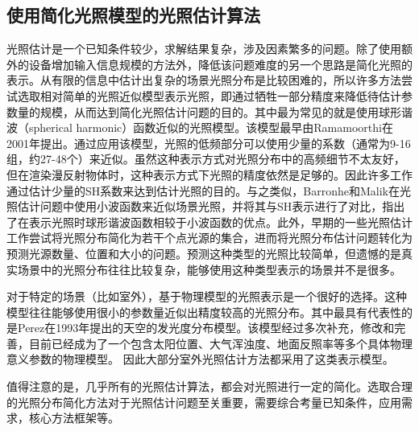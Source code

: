 \subsection{使用简化光照模型的光照估计算法}
光照估计是一个已知条件较少，求解结果复杂，涉及因素繁多的问题。除了使用额外的设备增加输入信息规模的方法外，降低该问题难度的另一个思路是简化光照的表示。从有限的信息中估计出复杂的场景光照分布是比较困难的，所以许多方法尝试选取相对简单的光照近似模型表示光照，即通过牺牲一部分精度来降低待估计参数量的规模，从而达到简化光照估计问题的目的。其中最为常见的就是使用球形谐波（spherical harmonic）函数近似的光照模型。该模型最早由Ramamoorthi\cite{ramamoorthi2001efficient}在2001年提出。通过应用该模型，光照的低频部分可以使用少量的系数（通常为9-16组，约27-48个）来近似。虽然这种表示方式对光照分布中的高频细节不太友好，但在渲染漫反射物体时，这种表示方式下光照的精度依然是足够的。因此许多工作\cite{ramamoorthi2001signal,kemelmacher20113d,garrido2013reconstructing,knorr2014real,li2014intrinsic,barron2015shape}通过估计少量的SH系数来达到估计光照的目的。与之类似，Barronhe和Malik\cite{okabe2004spherical}在光照估计问题中使用小波函数来近似场景光照，并将其与SH表示进行了对比，指出了在表示光照时球形谐波函数相较于小波函数的优点。此外，早期的一些光照估计工作\cite{sato1999acquiring,  panagopoulos2011illumination, wang2002estimation, li2003multiple, sato2003illumination}尝试将光照分布简化为若干个点光源的集合，进而将光照分布估计问题转化为预测光源数量、位置和大小的问题。预测这种类型的光照比较简单，但遗憾的是真实场景中的光照分布往往比较复杂，能够使用这种类型表示的场景并不是很多。

对于特定的场景（比如室外），基于物理模型的光照表示是一个很好的选择。这种模型往往能够使用很小的参数量近似出精度较高的光照分布。其中最具有代表性的是Perez\cite{perez1993all}在1993年提出的天空的发光度分布模型。该模型经过多次补充，修改和完善\cite{nishita1996display, sirai1993display,preetham1999practical,raab2008unbiased,hosek2012analytic, hovsekhovsek2013adding}，目前已经成为了一个包含太阳位置、大气浑浊度、地面反照率等多个具体物理意义参数的物理模型。
因此大部分室外光照估计方法\cite{lalonde2008does, lalonde2010sun, lalonde2012estimating, sunkavalli2008color}都采用了这类表示模型。

值得注意的是，几乎所有的光照估计算法，都会对光照进行一定的简化。选取合理的光照分布简化方法对于光照估计问题至关重要，需要综合考量已知条件，应用需求，核心方法框架等。


